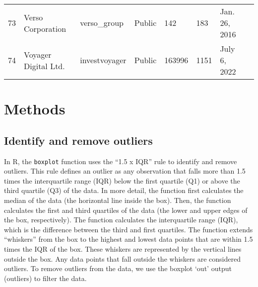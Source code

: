 \documentclass[9pt,twoside,lineno]{pnas-new}
\begin{document}
\begin{longtable}{llllllll}
73          & Verso Corporation                                                               & verso\_group                                                        & Public           & 142                & 183             & Jan. 26, 2016                                                                                                                      \\
74          & Voyager Digital Ltd.                                                            & investvoyager                                                       & Public           & 163996             & 1151               & July 6, 2022                                                                                                                          \\ \hline
\end{longtable}

\section*{Methods}
\label{sec:SI_methods}
\subsection*{Identify and remove outliers}
In R, the \texttt{boxplot} function uses the ``1.5 x IQR'' rule to identify and remove outliers. This rule defines an outlier as any observation that falls more than 1.5 times the interquartile range (IQR) below the first quartile (Q1) or above the third quartile (Q3) of the data.
In more detail, the function first calculates the median of the data (the horizontal line inside the box).
Then, the function calculates the first and third quartiles of the data (the lower and upper edges of the box, respectively).
The function calculates the interquartile range (IQR), which is the difference between the third and first quartiles.
The function extends ``whiskers'' from the box to the highest and lowest data points that are within 1.5 times the IQR of the box. These whiskers are represented by the vertical lines outside the box.
Any data points that fall outside the whiskers are considered outliers.
To remove outliers from the data, we use the boxplot `out' output (outliers) to filter the data.

\end{document}
